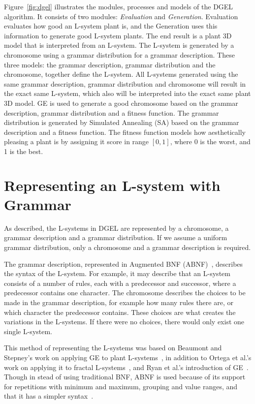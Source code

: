Figure~\ref{fig:dgel} illustrates the modules, processes and models of the DGEL algorithm.
It consists of two modules: \textit{Evaluation} and \textit{Generation}.
Evaluation evaluates how good an L-system plant is, and the Generation uses this information to generate good L-system plants.
The end result is a plant 3D model that is interpreted from an L-system.
The L-system is generated by a chromosome using a grammar distribution for a grammar description.
These three models: the grammar description, grammar distribution and the chromosome, together define the L-system.
All L-systems generated using the same grammar description, grammar distribution and chromosome will result in the exact same L-system, which also will be interpreted into the exact same plant 3D model.
GE is used to generate a good chromosome based on the grammar description, grammar distribution and a fitness function.
The grammar distribution is generated by Simulated Annealing (SA) based on the grammar description and a fitness function.
The fitness function models how aesthetically pleasing a plant is by assigning it score in range $[0, 1]$, where 0 is the worst, and 1 is the best.

\section{Representing an L-system with Grammar}
\label{sec:grammar}
As described, the L-systems in DGEL are represented by a chromosome, a grammar description and a grammar distribution.
If we assume a uniform grammar distribution, only a chromosome and a grammar description is required.

The grammar description, represented in Augmented BNF (ABNF)~\cite{RFC5234}, describes the syntax of the L-system.
For example, it may describe that an L-system consists of a number of rules, each with a predecessor and successor, where a predecessor contains one character.
The chromosome describes the choices to be made in the grammar description, for example how many rules there are, or which character the predecessor contains.
These choices are what creates the variations in the L-systems.
If there were no choices, there would only exist one single L-system.

This method of representing the L-systems was based on Beaumont and Stepney's work on applying GE to plant L-systems~\cite{2009Beaumont}, in addition to Ortega et al.'s work on applying it to fractal L-systems~\cite{2003Ortega}, and Ryan et al.'s introduction of GE~\cite{1998Ryan}.
Though in stead of using traditional BNF, ABNF is used because of its support for repetitions with minimum and maximum, grouping and value ranges, and that it has a simpler syntax~\cite{RFC5234}.

